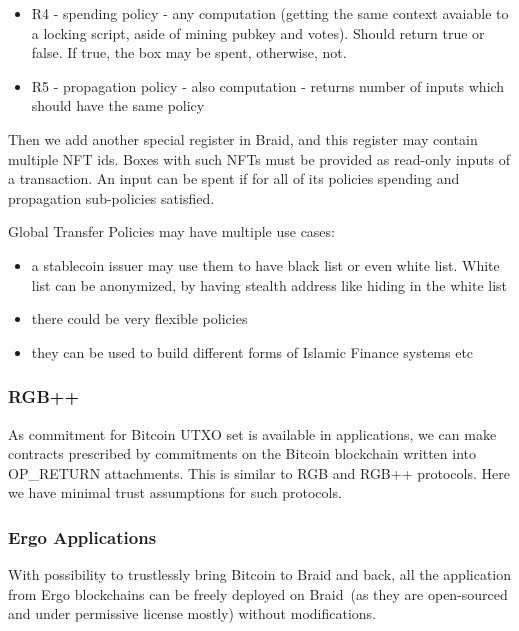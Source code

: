 \documentclass{llncs}   %
\newcommand{\bc}{Braid}
\begin{document}
\begin{itemize} 
 \item R4 - spending policy - any computation (getting the same context avaiable to a locking script, aside of mining pubkey and votes). Should return true or false. If true, the box may be spent, otherwise, not. 
 \item R5 - propagation policy - also computation - returns number of inputs which should have the same policy
\end{itemize}

Then we add another special register in Braid, and this register may contain multiple NFT ids. Boxes with such NFTs must be provided as read-only inputs of a transaction. An input can be spent if for all of its policies spending and propagation sub-policies satisfied.



Global Transfer Policies may have multiple use cases:

\begin{itemize}
  \item a stablecoin issuer may use them to have black list or even white list. White list can be anonymized, by having stealth address like hiding in the white list
  \item there could be very flexible policies
  \item they can be used to build different forms of Islamic Finance systems etc
\end{itemize}

\subsubsection{RGB++}

As commitment for Bitcoin UTXO set is available in applications, we can make contracts prescribed by commitments on the Bitcoin blockchain  written into OP\_RETURN attachments. This is similar to RGB and RGB++ protocols. Here we have minimal trust assumptions for such protocols.

\subsubsection{Ergo Applications}

With possibility to trustlessly bring Bitcoin to \bc{} and back, all the application from Ergo blockchains can be freely deployed on \bc{}~(as they are open-sourced and under permissive license mostly) without modifications.


\newpage

 
\end{document}
